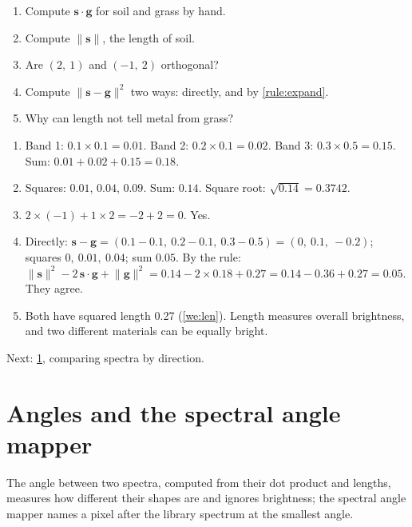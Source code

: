 \documentclass[11pt,a4paper,oneside,openany]{book}
\newcommand{\B}[1]{{\symbf{#1}}}
\newcommand{\B}[1]{{\bm{#1}}}
\newcommand{\nrm}[1]{\lVert #1\rVert}
\newcommand{\vg}{\B{g}}
\newcommand{\vs}{\B{s}}
\newcommand{\nextchapter}[1]{\par\medskip\noindent\hfill\textsf{\small Next: #1}\par}
\begin{document}
\begin{checkyourself}
\begin{enumerate}
\item Compute $\vs\cdot\vg$ for soil and grass by hand.
\item Compute $\nrm{\vs}$, the length of soil.
\item Are $(2,\ 1)$ and $(-1,\ 2)$ orthogonal?
\item Compute $\nrm{\vs-\vg}^2$ two ways: directly, and by \cref{rule:expand}.
\item Why can length not tell metal from grass?
\end{enumerate}
\end{checkyourself}

\begin{answers}
\begin{enumerate}
\item Band 1: $0.1\times0.1=0.01$. Band 2: $0.2\times0.1=0.02$. Band 3: $0.3\times0.5=0.15$. Sum: $0.01+0.02+0.15=0.18$.
\item Squares: $0.01$, $0.04$, $0.09$. Sum: $0.14$. Square root: $\sqrt{0.14}=0.3742$.
\item $2\times(-1)+1\times2=-2+2=0$. Yes.
\item Directly: $\vs-\vg=(0.1-0.1,\ 0.2-0.1,\ 0.3-0.5)=(0,\ 0.1,\ -0.2)$; squares $0,\ 0.01,\ 0.04$; sum $0.05$.
  By the rule: $\nrm{\vs}^2-2\,\vs\cdot\vg+\nrm{\vg}^2=0.14-2\times0.18+0.27=0.14-0.36+0.27=0.05$. They agree.
\item Both have squared length 0.27 (\cref{we:len}). Length measures overall brightness, and two different materials can
  be equally bright.
\end{enumerate}
\end{answers}

\nextchapter{\cref{ch:angles}, comparing spectra by direction.}

\chapter{Angles and the spectral angle mapper}
\label{ch:angles}

\begin{onething}
The angle between two spectra, computed from their dot product and lengths, measures how different their shapes are
and ignores brightness; the spectral angle mapper names a pixel after the library spectrum at the smallest angle.
\end{onething}
\end{document}
